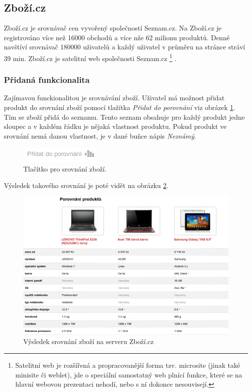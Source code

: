 \subsection{Zboží.cz}
Zboží.cz je srovnávač cen vyvořený společností Seznam.cz. Na Zboží.cz je registrováno více než 16000 obchodů a více nže 62 milionu produktů. Denně navštíví srovnávač 180000 uživatelů a každý uživatel v průměru na stránce stráví 39 min.\cite{website:zbozi-about}
Zboží.cz je satelitní web společnosti Seznam.cz
\footnote{Satelitní web je rozšířená a propracovanější forma tzv. microsite (jinak také minisite či weblet), jde o speciální samostatný web plnící funkce, které se na hlavní webovou prezentaci nehodí, nebo s ní dokonce nesouvisejí.}
.
\subsubsection{Přidaná funkcionalita}
Zajímavou funckionalitou je srovnávání zboží. Uživatel má možnost přidat produkt do srovnání zboží pomocí tlažítka \emph{Přidat do porovnání} viz obrázek \ref{fig:zbozicz-srovnat}. Tím se zboží přidá do seznamu. Tento seznam obsahuje pro každý produkt jedne sloupec a v každém řádku je nějaká vlastnost produktu. Pokud produkt ve srovnání nemá danou vlastnost, je v dané buňce nápis \emph{Neznámý}.

\begin{figure}[htb]
\begin{center}
\includegraphics[width=40mm]{./pictures/zbozicz-srovnat.png}
\caption{Tlačítko pro srovnání zboží.}
\label{fig:zbozicz-srovnat}
\end{center}
\end{figure}

Výsledek takového srovnání je poté vidět na obrázku \ref{fig:zbozicz-srovnani}.

\begin{figure}[htb]
\begin{center}
\includegraphics[width=130mm]{./pictures/zbozicz-srovnani.png}
\caption{Výsledek srovnání zboží na serveru Zboží.cz}
\label{fig:zbozicz-srovnani}
\end{center}
\end{figure}

